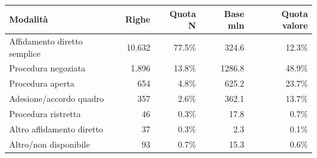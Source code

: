 \begin{tabular}{lrrrr}
\toprule
Modalità & Righe & Quota N & Base mln \texteuro{} & Quota valore \\
\midrule
Affidamento diretto semplice & 10.632 & 77.5\% & 324.6 & 12.3\% \\
Procedura negoziata & 1.896 & 13.8\% & 1286.8 & 48.9\% \\
Procedura aperta & 654 & 4.8\% & 625.2 & 23.7\% \\
Adesione/accordo quadro & 357 & 2.6\% & 362.1 & 13.7\% \\
Procedura ristretta & 46 & 0.3\% & 17.8 & 0.7\% \\
Altro affidamento diretto & 37 & 0.3\% & 2.3 & 0.1\% \\
Altro/non disponibile & 93 & 0.7\% & 15.3 & 0.6\% \\
\bottomrule
\end{tabular}
